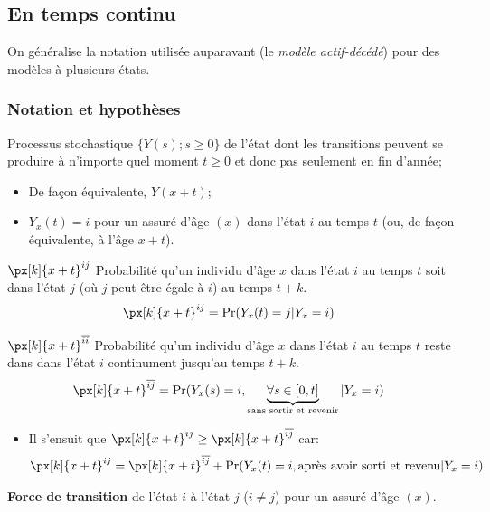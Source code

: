 \documentclass[10pt, french]{article}
\begin{document}
\begin{multicols*}{2}
\subsection*{En temps continu}
On généralise la notation utilisée auparavant (le \textit{modèle actif-décédé}) pour des modèles à plusieurs états.

\subsubsection*{Notation et hypothèses}
\begin{description}
	\item[$Y_{x}(t)$]	Processus stochastique $\{Y(s); s \ge 0\}$ de l'état dont les transitions peuvent se produire à n'importe quel moment $t \ge 0$ et donc pas seulement en fin d'année;
		\begin{itemize}[leftmargin = *]
		\item	De façon équivalente, $Y(x + t)$;
		\item	$Y_{x}(t) = i$ pour un assuré d'âge $(x)$ dans l'état $i$ au temps $t$ (ou, de façon équivalente, à l'âge $x + t$).
		\end{itemize}
	\item	$\px[k]{x + t}^{ij}$	Probabilité qu'un individu d'âge $x$ dans l'état $i$ au temps $t$ soit dans l'état $j$ (où $j$ peut être égale à $i$) au temps $t + k$.
		\begin{align*}
		\px[k]{x + t}^{ij}
		&=	\Pr(Y_{x}(t) = j | Y_{x} = i)
		\end{align*}
	\item	$\px[k]{x + t}^{\overline{ii}}$	Probabilité qu'un individu d'âge $x$ dans l'état $i$ au temps $t$ reste dans dans l'état $i$ continument jusqu'au temps $t + k$.
		\begin{align*}
		\px[k]{x + t}^{\overline{ij}}
		&=	\Pr(Y_{x}(s) = i, \underbrace{\forall s \in [0, t]}_{\text{sans sortir et revenir}} | Y_{x} = i)
		\end{align*}
		\begin{itemize}[leftmargin = *]
			\item	Il s'ensuit que $\px[k]{x + t}^{ij} \geq \px[k]{x + t}^{\overline{ij}}$ car:
				\begin{align*}
				\px[k]{x + t}^{ij}
				&=	\px[k]{x + t}^{\overline{ij}} + \Pr(Y_{x}(t) = i, \text{après avoir sorti et revenu} | Y_{x} = i)	\\
				\end{align*}
		\end{itemize}
	\item[$\mu_{x}^{ij}$]	\textbf{Force de transition} de l'état $i$ à l'état $j$ (\underline{$i \neq j$}) pour un assuré d'âge $(x)$.

\end{description}
\end{multicols*}
\end{document}
